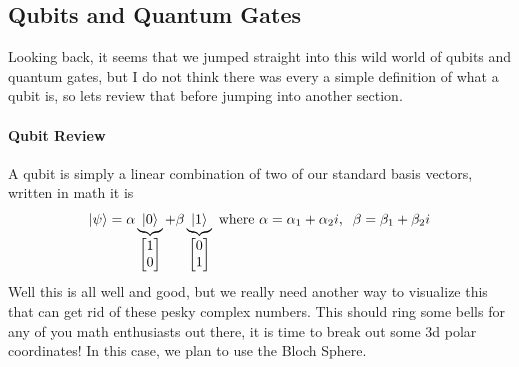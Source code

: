 \documentclass[12pt]{article}
\theoremstyle{plain}
\theoremstyle{nonumberplain}
\theoremstyle{plain}
\theoremstyle{nonumberplain}
\newcommand\1{{\bf 1}}
\newcommand{\bmat}[1]{\begin{bmatrix*} #1 \end{bmatrix*}} %
\newcommand{\<}{\left\langle}
\renewcommand{\>}{\right\rangle}
\begin{document}
\pagebreak

\subsection{Qubits and Quantum Gates}
Looking back, it seems that we jumped straight into this wild world of qubits and quantum gates, but I do not think there was every a simple definition of what a qubit is, so lets review that before jumping into another section. 

\paragraph{Qubit Review}
A qubit is simply a linear combination of two of our standard basis vectors, written in math it is
\begin{equation}
\ket{\psi} = \alpha\underbrace{\ket{0}}_{\bmat{1\\0}} + \beta\underbrace{\ket{1}}_{\bmat{0\\1}} \text{ where } \alpha = \alpha_1 + \alpha_2 i, \;\; \beta = \beta_1 + \beta_2 i
\end{equation} 
Well this is all well and good, but we really need another way to visualize this that can get rid of these pesky complex numbers.  This should ring some bells for any of you math enthusiasts out there, it is time to break out some 3d polar coordinates!  In this case, we plan to use the Bloch Sphere.

\pagebreak
\end{document}

